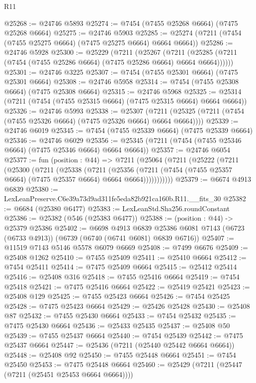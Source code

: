 \begin{lexlean}{R11}
\begin{coremodule}
@25268 := @24746 @5893
@25274 := @7454 (@7455 @25268 @6664) (@7475 @25268 @6664)
@25275 := @24746 @5903
@25285 := @25274 (@7211 (@7454 (@7455 @25275 @6664) (@7475 @25275 @6664) @6664 @6664))
@25286 := @24746 @5928
@25300 := @25229
    (@7211
      (@25267
        (@7211 (@25285 (@7211 (@7454 (@7455 @25286 @6664) (@7475 @25286 @6664) @6664 @6664))))))
@25301 := @24746 @3225
@25307 := @7454 (@7455 @25301 @6664) (@7475 @25301 @6664)
@25308 := @24746 @5958
@25314 := @7454 (@7455 @25308 @6664) (@7475 @25308 @6664)
@25315 := @24746 @5968
@25325 := @25314 (@7211 (@7454 (@7455 @25315 @6664) (@7475 @25315 @6664) @6664 @6664))
@25326 := @24746 @5993
@25338 := @25307
    (@7211 (@25325 (@7211 (@7454 (@7455 @25326 @6664) (@7475 @25326 @6664) @6664 @6664))))
@25339 := @24746 @6019
@25345 := @7454 (@7455 @25339 @6664) (@7475 @25339 @6664)
@25346 := @24746 @6029
@25356 := @25345 (@7211 (@7454 (@7455 @25346 @6664) (@7475 @25346 @6664) @6664 @6664))
@25357 := @24746 @6054
@25377 := fun (position : @44) =>
  @7211
    (@25064
      (@7211
        (@25222
          (@7211
            (@25300
              (@7211
                (@25338
                  (@7211
                    (@25356
                      (@7211 (@7454 (@7455 @25357 @6664) (@7475 @25357 @6664) @6664 @6664)))))))))))
@25379 := @6674 @4913 @6839
@25380 := LexLeanPreserve.C6e39a73d9ad311fe5eda82b921ca160b.R11.__fits_30
@25382 := @6684 (@25380 @6477)
@25383 := LexLeanStd.Sha256.roundConstant
@25386 := @25382 (@546 (@25383 @6477))
@25388 := (position : @44) -> @25379 @25386
@25402 := @6698
    @4913
    @6839
    @25386
    @6081
    @7143
    (@6723 (@6733 @4913))
    (@6739 (@6740 (@6741 @6081) @6839 @6716))
@25407 := @11519 @7143 @5146 @5578 @6079 @6669
@25408 := @7499 @6676
@25409 := @25408 @1262
@25410 := @7455 @25409
@25411 := @25410 @6664
@25412 := @7454 @25411
@25414 := @7475 @25409 @6664
@25415 := @25412 @25414
@25416 := @25408 @316
@25418 := @7455 @25416 @6664
@25419 := @7454 @25418
@25421 := @7475 @25416 @6664
@25422 := @25419 @25421
@25423 := @25408 @129
@25425 := @7455 @25423 @6664
@25426 := @7454 @25425
@25428 := @7475 @25423 @6664
@25429 := @25426 @25428
@25430 := @25408 @87
@25432 := @7455 @25430 @6664
@25433 := @7454 @25432
@25435 := @7475 @25430 @6664
@25436 := @25433 @25435
@25437 := @25408 @50
@25439 := @7455 @25437 @6664
@25440 := @7454 @25439
@25442 := @7475 @25437 @6664
@25447 := @25436 (@7211 (@25440 @25442 @6664 @6664))
@25448 := @25408 @92
@25450 := @7455 @25448 @6664
@25451 := @7454 @25450
@25453 := @7475 @25448 @6664
@25460 := @25429 (@7211 (@25447 (@7211 (@25451 @25453 @6664 @6664))))

\end{coremodule}
\end{lexlean}
